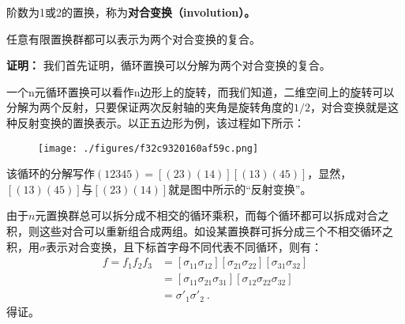 
\begin{definition}{}
阶数为1或2的置换，称为\textbf{对合变换（involution）。}
\end{definition}
\begin{theorem}{}
任意有限置换群都可以表示为两个对合变换的复合。
\end{theorem}
\textbf{证明：}
我们首先证明，循环置换可以分解为两个对合变换的复合。

一个n元循环置换可以看作n边形上的旋转，而我们知道，二维空间上的旋转可以分解为两个反射，只要保证两次反射轴的夹角是旋转角度的$1/2$，对合变换就是这种反射变换的置换表示。以正五边形为例，该过程如下所示：
\begin{figure}[ht]
\centering
\texttt{[image: ./figures/f32c9320160af59c.png]}
\caption{} \label{fig_AutSym_2}
\end{figure}
该循环的分解写作$(12345)=[(23)(14)][(13)(45)]$，显然，$[(13)(45)]$与$[(23)(14)]$就是图中所示的“反射变换”。

由于$n$元置换群总可以拆分成不相交的循环乘积，而每个循环都可以拆成对合之积，则这些对合可以重新组合成两组。如设某置换群可拆分成三个不相交循环之积，用$\sigma$表示对合变换，且下标首字母不同代表不同循环，则有：
\begin{equation}
\begin{aligned}
f=f_1f_2f_3&=[\sigma_{11}\sigma_{12}][\sigma_{21}\sigma_{22}][\sigma_{31}\sigma_{32}]\\
&=[\sigma_{11}\sigma_{21}\sigma_{31}][\sigma_{12}\sigma_{22}\sigma_{32}]\\
&=\sigma'_1\sigma'_2~.
\end{aligned}
\end{equation}
得证。

